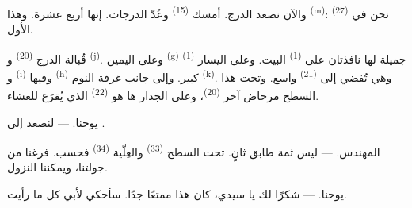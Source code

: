 والآن نصعد الدرج. أمسك  \textsuperscript{(15)} وعُدّ
الدرجات. إنها أربع عشرة. وهذا  \textsuperscript{(m)}: نحن في
 \textsuperscript{(27)} الأول.

\VUsaut{3.0mm}
\VUsaut{3.0mm}

قُبالة الدرج  \textsuperscript{(20)} و
\textsuperscript{(j)}. وعلى اليمين  \textsuperscript{(g)} جميلة لها
نافذتان على  \textsuperscript{(1)} البيت. وعلى اليسار
 \textsuperscript{(1)} و \textsuperscript{(i)} وفيها
 \textsuperscript{(h)} كبير. وإلى جانب غرفة النوم  \textsuperscript{(k)}. وهي تُفضي إلى  \textsuperscript{(21)}
واسع. وتحت هذا السطح مرحاض آخر \textsuperscript{(20)}، وعلى الجدار ها هو
 \textsuperscript{(22)} الذي يُقرَع للعشاء.

\textsc{يوحنا}. --- لنصعد إلى .

\textsc{المهندس}. --- ليس ثمة طابق ثانٍ. تحت السطح 
\textsuperscript{(33)} والعِلّية \textsuperscript{(34)} فحسب. فرغنا من جولتنا،
ويمكننا النزول.

\textsc{يوحنا}. --- شكرًا لك يا سيدي، كان هذا ممتعًا جدًا. سأحكي لأبي كل
ما رأيت.
\VUsaut{4.0mm}
\VUfilet{22mm}
